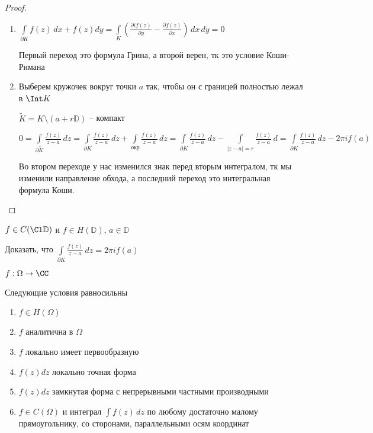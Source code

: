\begin{proof}\thmslashn
		
	\begin{enumerate}
		\item 
		$\int\limits_{\partial K} f(z)\,dx + f(z)dy = \int\limits_{K}\left( \frac{\partial if(z)}{\partial y} - \frac{\partial f(z)}{\partial x} \right)\,dx\,dy = 0$
		
		Первый переход это формула Грина, а второй верен, тк это условие Коши-Римана 
		
		\item
		Выберем кружочек вокруг точки $a$ так, чтобы он с границей полностью лежал в $\Int K$
		
		$\tilde{K} = K \setminus(a + r\mathbb{D})$ -- компакт
		
		$0 = \int\limits_{\partial \tilde{K}} \frac{f(z)}{z-a}\,dz = \int\limits_{\partial K} \frac{f(z)}{z-a}\,dz + \int\limits_{\text{окр}} \frac{f(z)}{z-a}\,dz =  \int\limits_{\partial K} \frac{f(z)}{z-a}\,dz - \int\limits_{|z-a| = r} \frac{f(z)}{z-a}\,d = \int\limits_{\partial K} \frac{f(z)}{z-a}\,dz - 2\pi i f(a)$
		
		Во втором переходе у нас изменился знак перед вторым интегралом, тк мы изменили направление обхода, а последний переход это интегральная формула Коши.
	\end{enumerate}
	
\end{proof}

\begin{exerc}
	$f\in C(\Cl \mathbb{D})$ и $f \in H(\mathbb{D})$, $a \in \mathbb{D}$
	
	Доказать, что $\int\limits_{\partial K} \frac{f(z)}{z-a}\,dz = 2\pi i f(a)$
\end{exerc}

\begin{theorem}\thmslashn
	
	$f:\Omega \to \CC$ 
	
	Следующие условия равносильны
	
	\begin{enumerate}[1)]
		\item 
		$f\in H(\Omega)$
		\item
		$f$ аналитична в $\Omega$
		\item
		$f$ локально имеет первообразную
		\item
		$f(z)dz$ локально точная форма
		\item
		$f(z)dz$ замкнутая форма с непрерывными частными производными 
		\item
		$f\in C(\Omega)$ и интеграл $\int f(z)\,dz$ по любому достаточно малому прямоугольнику, со сторонами, параллельными осям координат
		 
	\end{enumerate}
	
\end{theorem}

